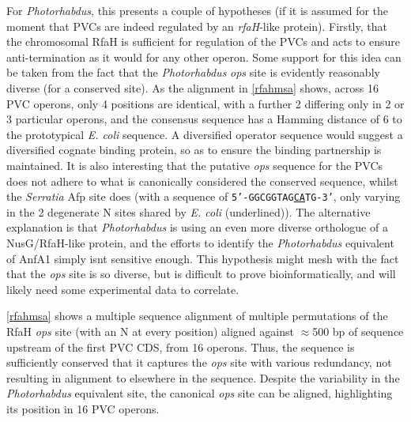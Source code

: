 For \emph{Photorhabdus}, this presents a couple of hypotheses (if it is assumed for the moment that PVCs are indeed regulated by an \emph{rfaH}-like protein). Firstly, that the chromosomal RfaH is sufficient for regulation of the PVCs and acts to ensure anti-termination as it would for any other operon. Some support for this idea can be taken from the fact that the \emph{Photorhabdus} \emph{ops} site is evidently reasonably diverse (for a conserved site). As the alignment in \vref{rfahmsa} shows, across 16 PVC operons, only 4 positions are identical, with a further 2 differing only in 2 or 3 particular operons, and the consensus sequence has a Hamming distance of 6 to the prototypical \emph{E. coli} sequence. A diversified operator sequence would suggest a diversified cognate binding protein, so as to ensure the binding partnership is maintained. It is also interesting that the putative \emph{ops} sequence for the PVCs does not adhere to what is canonically considered the conserved sequence, whilst the \emph{Serratia} Afp site does (with a sequence of \texttt{5'-GGCGGTAG\underline{CA}TG-3'}, only varying in the 2 degenerate N sites shared by \emph{E. coli} (underlined)). The alternative explanation is that \emph{Photorhabdus} is using an even more diverse orthologue of a NusG/RfaH-like protein, and the efforts to identify the \emph{Photorhabdus} equivalent of AnfA1 simply isnt sensitive enough. This hypothesis might mesh with the fact that the \emph{ops} site is so diverse, but is difficult to prove bioinformatically, and will likely need some experimental data to correlate.

\vref{rfahmsa} shows a multiple sequence alignment of multiple permutations of the RfaH \emph{ops} site (with an N at every position) aligned against $\approx$500 bp of sequence upstream of the first PVC CDS, from 16 operons. Thus, the sequence is sufficiently conserved that it captures the \emph{ops} site with various redundancy, not resulting in alignment to elsewhere in the sequence. Despite the variability in the \emph{Photorhabdus} equivalent site, the canonical \emph{ops} site can be aligned, highlighting its position in 16 PVC operons.

